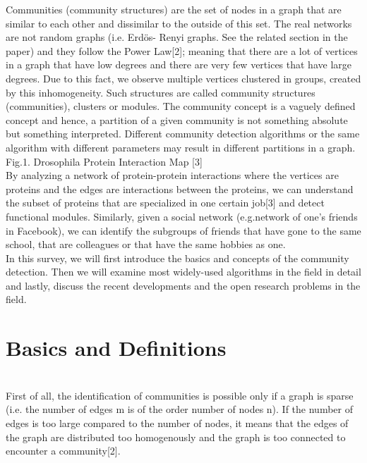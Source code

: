 \documentclass[10pt]{article}
\begin{document}
Communities (community structures) are the set of nodes in a graph that are similar to each other and dissimilar to the outside of this set. The real networks are not random graphs (i.e. Erdös- Renyi graphs. See the related section in the paper) and they follow the Power Law[2]; meaning that there are a lot of vertices in a graph that have low degrees and there are very few vertices that have large degrees. Due to this fact, we observe multiple vertices clustered in groups, created by this inhomogeneity. Such structures are called community structures (communities), clusters or modules. The community concept is a vaguely defined concept and hence, a partition of a given community is not something absolute but something interpreted. Different community detection algorithms or the same algorithm with different parameters may result in different partitions in a graph.\\

Fig.1. Drosophila Protein Interaction Map [3] \\

By analyzing a network of protein-protein interactions where the vertices are proteins and the edges are interactions between the proteins, we can understand the subset of proteins that are specialized in one certain job[3] and detect functional modules. Similarly, given a social network (e.g.network of one’s friends in Facebook), we can identify the subgroups of friends that have gone to the same school, that are colleagues or that have the same hobbies as one. \\

In this survey, we will first introduce the basics and concepts of the community detection. Then we will examine most widely-used algorithms in the field in detail and lastly, discuss the recent developments and the open research problems in the field. \\

\section{Basics and Definitions} \\

First of all, the identification of communities is possible only if a graph is sparse (i.e. the number of edges m is of the order number of nodes n). If the number of edges is too large compared to the number of nodes, it means that the edges of the graph are distributed too homogenously and the graph is too connected to encounter a community[2]. \\
\end{document}
